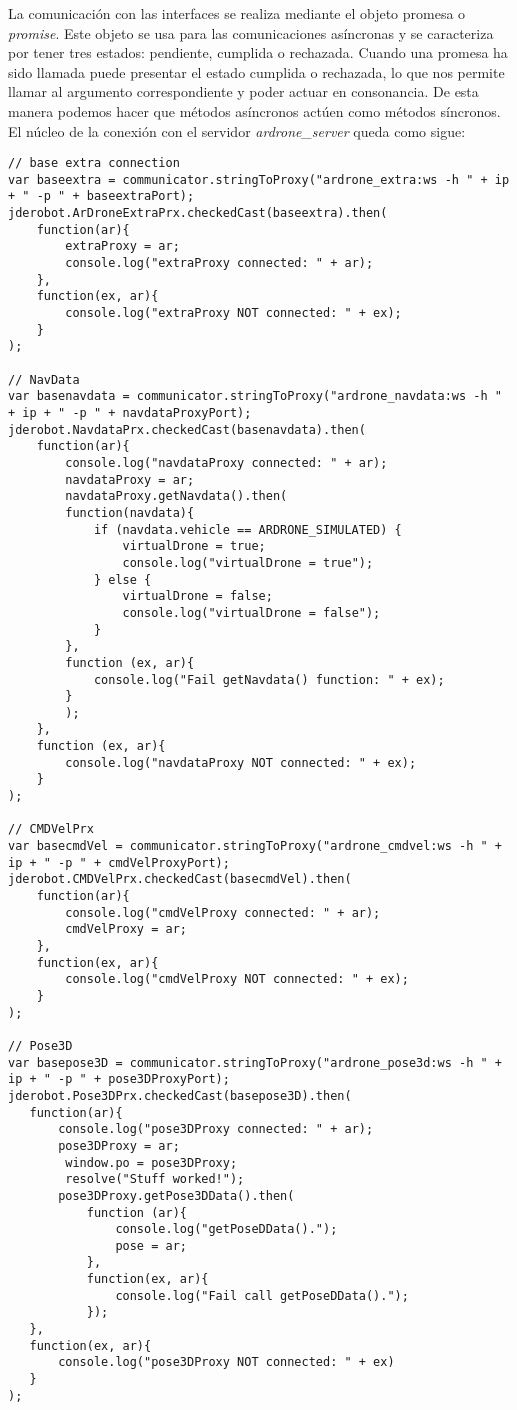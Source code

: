 La comunicación con las interfaces se realiza mediante el objeto promesa o \emph{promise}. Este objeto se usa para las comunicaciones asíncronas y se caracteriza por tener tres estados: pendiente, cumplida o rechazada. Cuando una promesa ha sido llamada puede presentar el estado cumplida o rechazada, lo que nos permite llamar al argumento correspondiente y poder actuar en consonancia. De esta manera podemos hacer que métodos asíncronos actúen como métodos síncronos.\\

El núcleo de la conexión con el servidor \emph{ardrone\_server} queda como sigue:\\

\begin{lstlisting}[caption=Núcleo ArDrone]
// base extra connection
var baseextra = communicator.stringToProxy("ardrone_extra:ws -h " + ip + " -p " + baseextraPort);
jderobot.ArDroneExtraPrx.checkedCast(baseextra).then(
    function(ar){
        extraProxy = ar;
        console.log("extraProxy connected: " + ar);
    },
    function(ex, ar){
        console.log("extraProxy NOT connected: " + ex);
    }
);               

// NavData
var basenavdata = communicator.stringToProxy("ardrone_navdata:ws -h " + ip + " -p " + navdataProxyPort);
jderobot.NavdataPrx.checkedCast(basenavdata).then(
    function(ar){
        console.log("navdataProxy connected: " + ar);
        navdataProxy = ar;
        navdataProxy.getNavdata().then(
        function(navdata){
            if (navdata.vehicle == ARDRONE_SIMULATED) {
                virtualDrone = true;
                console.log("virtualDrone = true");
            } else {
                virtualDrone = false;
                console.log("virtualDrone = false");
            }
        },
        function (ex, ar){
            console.log("Fail getNavdata() function: " + ex);
        }
        );
    },
    function (ex, ar){
        console.log("navdataProxy NOT connected: " + ex);
    }        
);        

// CMDVelPrx
var basecmdVel = communicator.stringToProxy("ardrone_cmdvel:ws -h " + ip + " -p " + cmdVelProxyPort);
jderobot.CMDVelPrx.checkedCast(basecmdVel).then(
    function(ar){
        console.log("cmdVelProxy connected: " + ar);
        cmdVelProxy = ar;
    },
    function(ex, ar){
        console.log("cmdVelProxy NOT connected: " + ex);
    }
);             

// Pose3D
var basepose3D = communicator.stringToProxy("ardrone_pose3d:ws -h " + ip + " -p " + pose3DProxyPort);
jderobot.Pose3DPrx.checkedCast(basepose3D).then(
   function(ar){
       console.log("pose3DProxy connected: " + ar);
       pose3DProxy = ar;
        window.po = pose3DProxy;
        resolve("Stuff worked!");
       pose3DProxy.getPose3DData().then(
           function (ar){
               console.log("getPoseDData().");
               pose = ar;
           },
           function(ex, ar){
               console.log("Fail call getPoseDData().");
           });
   },
   function(ex, ar){
       console.log("pose3DProxy NOT connected: " + ex)
   }
);
\end{lstlisting}

